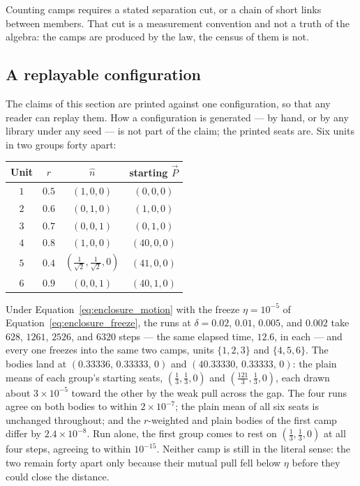 \documentclass[12pt, a4paper]{article}
\begin{document}
Counting camps requires a stated separation cut, or a chain of short
links between members. That cut is a measurement convention and not
a truth of the algebra: the camps are produced by the law, the
census of them is not.

\subsection{A replayable configuration}
\label{subsec:enclosure_replay}
The claims of this section are printed against one configuration, so
that any reader can replay them. How a configuration is generated ---
by hand, or by any library under any seed --- is not part of the
claim; the printed seats are. Six units in two groups forty apart:

\begin{center}
\begin{tabular}{cccc}
Unit & $r$ & $\hat n$ & starting $\vec P$ \\
\hline
$1$ & $0.5$ & $(1,0,0)$ & $(0,0,0)$ \\
$2$ & $0.6$ & $(0,1,0)$ & $(1,0,0)$ \\
$3$ & $0.7$ & $(0,0,1)$ & $(0,1,0)$ \\
$4$ & $0.8$ & $(1,0,0)$ & $(40,0,0)$ \\
$5$ & $0.4$ & $(\tfrac{1}{\sqrt2},\tfrac{1}{\sqrt2},0)$ & $(41,0,0)$ \\
$6$ & $0.9$ & $(0,0,1)$ & $(40,1,0)$ \\
\end{tabular}
\end{center}

Under Equation~\eqref{eq:enclosure_motion} with the freeze
$\eta=10^{-5}$ of Equation~\eqref{eq:enclosure_freeze}, the runs at
$\delta=0.02$, $0.01$, $0.005$, and $0.002$ take $628$, $1261$,
$2526$, and $6320$ steps --- the same elapsed time, $12.6$, in each
--- and every one freezes into the same two camps, units $\{1,2,3\}$
and $\{4,5,6\}$. The bodies land at
$(0.33336,\,0.33333,\,0)$ and $(40.33330,\,0.33333,\,0)$: the plain
means of each group's starting seats, $(\tfrac13,\tfrac13,0)$ and
$(\tfrac{121}{3},\tfrac13,0)$, each drawn about $3\times10^{-5}$
toward the other by the weak pull across the gap. The four runs agree
on both bodies to within $2\times10^{-7}$; the plain mean of all six
seats is unchanged throughout; and the $r$-weighted and plain bodies
of the first camp differ by $2.4\times10^{-8}$. Run alone, the first
group comes to rest on $(\tfrac13,\tfrac13,0)$ at all four steps,
agreeing to within $10^{-15}$. Neither camp is still in the
literal sense: the two remain forty apart only because their mutual
pull fell below $\eta$ before they could close the distance.
\end{document}
